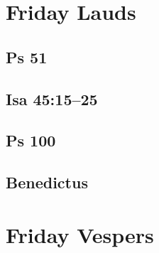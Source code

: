 {%
\parindent 0pt
\noindent
\ifx\preLilyPondExample \undefined
\else
  \expandafter\preLilyPondExample
\fi
\def\lilypondbook{}%

\ifx\postLilyPondExample \undefined
\else
  \expandafter\postLilyPondExample
\fi
}


\section{Friday Lauds}

\subsection{Ps 51}

{%
\parindent 0pt
\noindent
\ifx\preLilyPondExample \undefined
\else
  \expandafter\preLilyPondExample
\fi
\def\lilypondbook{}%

\ifx\postLilyPondExample \undefined
\else
  \expandafter\postLilyPondExample
\fi
}

\subsection{Isa 45:15--25}

{%
\parindent 0pt
\noindent
\ifx\preLilyPondExample \undefined
\else
  \expandafter\preLilyPondExample
\fi
\def\lilypondbook{}%

\ifx\postLilyPondExample \undefined
\else
  \expandafter\postLilyPondExample
\fi
}

\subsection{Ps 100}

{%
\parindent 0pt
\noindent
\ifx\preLilyPondExample \undefined
\else
  \expandafter\preLilyPondExample
\fi
\def\lilypondbook{}%

\ifx\postLilyPondExample \undefined
\else
  \expandafter\postLilyPondExample
\fi
}

\subsection{Benedictus}

{%
\parindent 0pt
\noindent
\ifx\preLilyPondExample \undefined
\else
  \expandafter\preLilyPondExample
\fi
\def\lilypondbook{}%

\ifx\postLilyPondExample \undefined
\else
  \expandafter\postLilyPondExample
\fi
}


\section{Friday Vespers}

